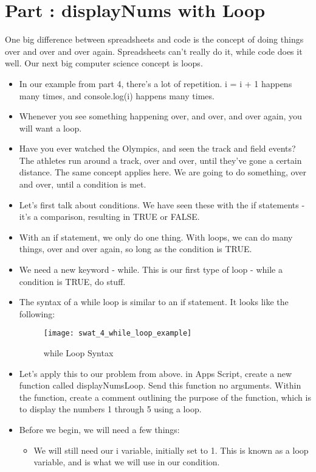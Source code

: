 \documentclass{article}
\begin{document}
\section*{Part : displayNums with Loop}
One big difference between spreadsheets and code is the concept of doing things over and over and over again.  Spreadsheets can't really do it, while code does it well.  Our next big computer science concept is loops.
\begin{itemize}
	\item In our example from part 4, there's a lot of repetition.  i = i + 1 happens many times, and console.log(i) happens many times.  
	\item Whenever you see something happening over, and over, and over again, you will want a loop.
	\item Have you ever watched the Olympics, and seen the track and field events?  The athletes run around a track, over and over, until they've gone a certain distance.  The same concept applies here.  We are going to do something, over and over, until a condition is met.
	\item Let's first talk about conditions.  We have seen these with the if statements - it's a comparison, resulting in TRUE or FALSE.
	\item With an if statement, we only do one thing.  With loops, we can do many things, over and over again, so long as the condition is TRUE.
	\item We need a new keyword - while.  This is our first type of loop - while a condition is TRUE, do stuff.
	\item The syntax of a while loop is similar to an if statement.  It looks like the following:
	\begin{figure}[H]
  		\centering
  		\texttt{[image: swat\_4\_while\_loop\_example]}
  		\caption{while Loop Syntax}
	\end{figure}
	\item Let's apply this to our problem from above.  in Apps Script, create a new function called displayNumsLoop.  Send this function no arguments.  Within the function, create a comment outlining the purpose of the function, which is to display the numbers 1 through 5 using a loop.
	\item Before we begin, we will need a few things:
	\begin{itemize}
		\item We will still need our i variable, initially set to 1.  This is known as a loop variable, and is what we will use in our condition.

\end{itemize}
\end{itemize}
\end{document}
